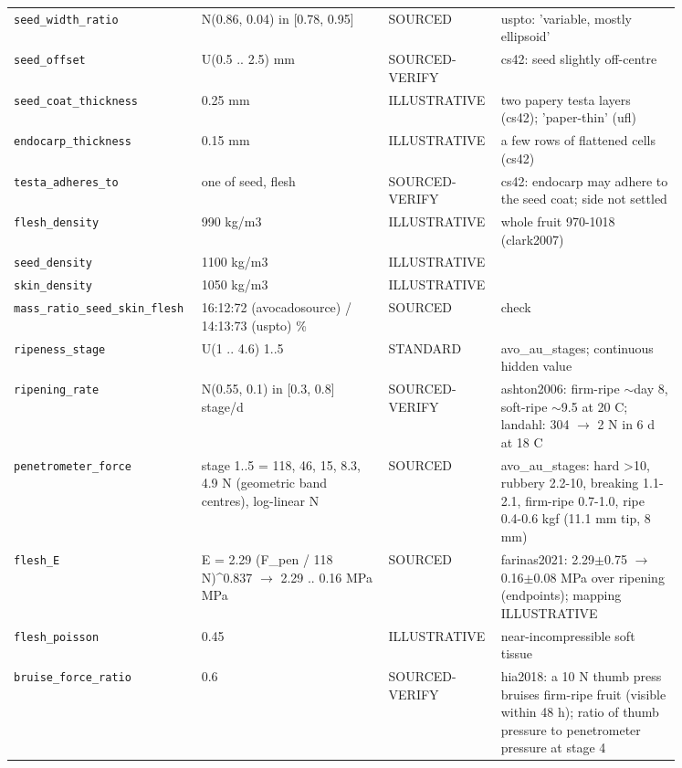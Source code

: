 \documentclass[10.5pt,a4paper]{article}
\begin{document}
{\begin{longtable}{@{}p{0.2\linewidth}p{0.27\linewidth}p{0.12\linewidth}p{0.26\linewidth}@{}}
\texttt{seed\_\allowbreak{}width\_\allowbreak{}ratio} & N(0.86, 0.04) in [0.78, 0.95] & SOURCED & uspto: 'variable, mostly ellipsoid' \\
\texttt{seed\_\allowbreak{}offset} & U(0.5 .. 2.5) mm & SOURCED-VERIFY & cs42: seed slightly off-centre \\
\texttt{seed\_\allowbreak{}coat\_\allowbreak{}thickness} & 0.25 mm & ILLUSTRATIVE & two papery testa layers (cs42); 'paper-thin' (ufl) \\
\texttt{endocarp\_\allowbreak{}thickness} & 0.15 mm & ILLUSTRATIVE & a few rows of flattened cells (cs42) \\
\texttt{testa\_\allowbreak{}adheres\_\allowbreak{}to} & one of seed, flesh & SOURCED-VERIFY & cs42: endocarp may adhere to the seed coat; side not settled \\
\texttt{flesh\_\allowbreak{}density} & 990 kg/m3 & ILLUSTRATIVE & whole fruit 970-1018 (clark2007) \\
\texttt{seed\_\allowbreak{}density} & 1100 kg/m3 & ILLUSTRATIVE &  \\
\texttt{skin\_\allowbreak{}density} & 1050 kg/m3 & ILLUSTRATIVE &  \\
\texttt{mass\_\allowbreak{}ratio\_\allowbreak{}seed\_\allowbreak{}skin\_\allowbreak{}flesh} & 16:12:72 (avocadosource) / 14:13:73 (uspto) \% & SOURCED & check \\
\texttt{ripeness\_\allowbreak{}stage} & U(1 .. 4.6) 1..5 & STANDARD & avo\_au\_stages; continuous hidden value \\
\texttt{ripening\_\allowbreak{}rate} & N(0.55, 0.1) in [0.3, 0.8] stage/d & SOURCED-VERIFY & ashton2006: firm-ripe $\sim$day 8, soft-ripe $\sim$9.5 at 20 C; landahl: 304 $\to$ 2 N in 6 d at 18 C \\
\texttt{penetrometer\_\allowbreak{}force} & stage 1..5 = 118, 46, 15, 8.3, 4.9 N (geometric band centres), log-linear N & SOURCED & avo\_au\_stages: hard >10, rubbery 2.2-10, breaking 1.1-2.1, firm-ripe 0.7-1.0, ripe 0.4-0.6 kgf (11.1 mm tip, 8 mm) \\
\texttt{flesh\_\allowbreak{}E} & E = 2.29 (F\_pen / 118 N)\^{}0.837 $\to$ 2.29 .. 0.16 MPa MPa & SOURCED & farinas2021: 2.29$\pm$0.75 $\to$ 0.16$\pm$0.08 MPa over ripening (endpoints); mapping ILLUSTRATIVE \\
\texttt{flesh\_\allowbreak{}poisson} & 0.45 & ILLUSTRATIVE & near-incompressible soft tissue \\
\texttt{bruise\_\allowbreak{}force\_\allowbreak{}ratio} & 0.6 & SOURCED-VERIFY & hia2018: a 10 N thumb press bruises firm-ripe fruit (visible within 48 h); ratio of thumb pressure to penetrometer pressure at stage 4 \\

\end{longtable}}
\end{document}
